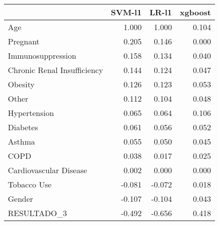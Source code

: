 \begin{tabular}{lrrr}
\toprule
{} &  SVM-l1 &  LR-l1 &  xgboost \\
\midrule
Age                         &   1.000 &  1.000 &    0.104 \\
Pregnant                    &   0.205 &  0.146 &    0.000 \\
Immunosuppression           &   0.158 &  0.134 &    0.040 \\
Chronic Renal Insufficiency &   0.144 &  0.124 &    0.047 \\
Obesity                     &   0.126 &  0.123 &    0.053 \\
Other                       &   0.112 &  0.104 &    0.048 \\
Hypertension                &   0.065 &  0.064 &    0.106 \\
Diabetes                    &   0.061 &  0.056 &    0.052 \\
Asthma                      &   0.055 &  0.050 &    0.045 \\
COPD                        &   0.038 &  0.017 &    0.025 \\
Cardiovascular Disease      &   0.002 &  0.000 &    0.000 \\
Tobacco Use                 &  -0.081 & -0.072 &    0.018 \\
Gender                      &  -0.107 & -0.104 &    0.043 \\
RESULTADO\_3                 &  -0.492 & -0.656 &    0.418 \\
\bottomrule
\end{tabular}
